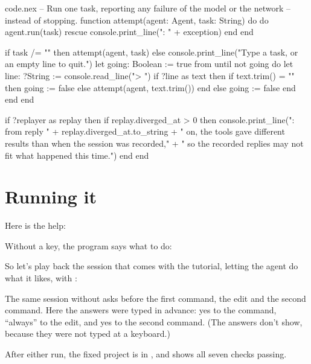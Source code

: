 \begin{continued}{code.nex}
-- Run one task, reporting any failure of the model or the network
-- instead of stopping.
function attempt(agent: Agent, task: String) do
  do
    agent.run(task)
  rescue
    console.print_line("\nerror: " + exception)
  end
end

if task /= "" then
  attempt(agent, task)
else
  console.print_line("Type a task, or an empty line to quit.")
  let going: Boolean := true
  from until not going do
    let line: ?String := console.read_line("\nyou> ")
    if ?line as text then
      if text.trim() = "" then
        going := false
      else
        attempt(agent, text.trim())
      end
    else
      going := false
    end
  end
end

if ?replayer as replay then
  if replay.diverged_at > 0 then
    console.print_line("\nNote: from reply " + replay.diverged_at.to_string
      + " on, the tools gave different results than when the session was recorded,"
      + " so the recorded replies may not fit what happened this time.")
  end
end
\end{continued}

\section{Running it}

Here is the help:


Without a key, the program says what to do:


So let's play back the session that comes with the tutorial, letting the
agent do what it likes, with :


The same session without  asks before the first command, the
edit and the second command. Here the answers were typed in advance: yes
to the command, ``always'' to the edit, and yes to the second command.
(The answers don't show, because they were not typed at a keyboard.)

{}

After either run, the fixed project is in , and
 shows all seven checks passing.

